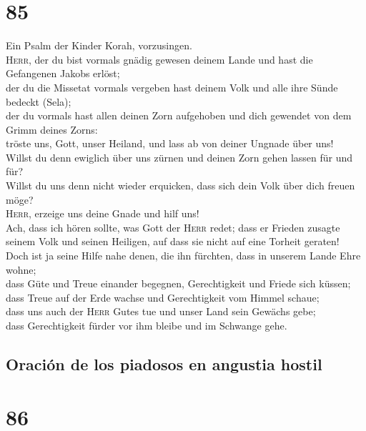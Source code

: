 \hypertarget{section-84}{%
\section{85}\label{section-84}}

 Ein Psalm der Kinder Korah, vorzusingen.\\
 \textsc{Herr}, der du bist vormals gnädig gewesen deinem
Lande und hast die Gefangenen Jakobs erlöst;\\
 der du die Missetat vormals vergeben hast deinem Volk und
alle ihre Sünde bedeckt (Sela);\\
 der du vormals hast allen deinen Zorn aufgehoben und dich
gewendet von dem Grimm deines Zorns:\\
 tröste uns, Gott, unser Heiland, und lass ab von deiner
Ungnade über uns!\\
 Willst du denn ewiglich über uns zürnen und deinen Zorn
gehen lassen für und für?\\
 Willst du uns denn nicht wieder erquicken, dass sich dein
Volk über dich freuen möge?\\
 \textsc{Herr}, erzeige uns deine Gnade und hilf uns!\\
 Ach, dass ich hören sollte, was Gott der \textsc{Herr}
redet; dass er Frieden zusagte seinem Volk und seinen Heiligen, auf dass
sie nicht auf eine Torheit geraten!\\
 Doch ist ja seine Hilfe nahe denen, die ihn fürchten,
dass in unserem Lande Ehre wohne;\\
 dass Güte und Treue einander begegnen, Gerechtigkeit und
Friede sich küssen;\\
 dass Treue auf der Erde wachse und Gerechtigkeit vom
Himmel schaue;\\
 dass uns auch der \textsc{Herr} Gutes tue und unser Land
sein Gewächs gebe;\\
 dass Gerechtigkeit fürder vor ihm bleibe und im Schwange
gehe.

\hypertarget{oraciuxf3n-de-los-piadosos-en-angustia-hostil}{%
\subsection{Oración de los piadosos en angustia
hostil}\label{oraciuxf3n-de-los-piadosos-en-angustia-hostil}}

\hypertarget{section-85}{%
\section{86}\label{section-85}}

